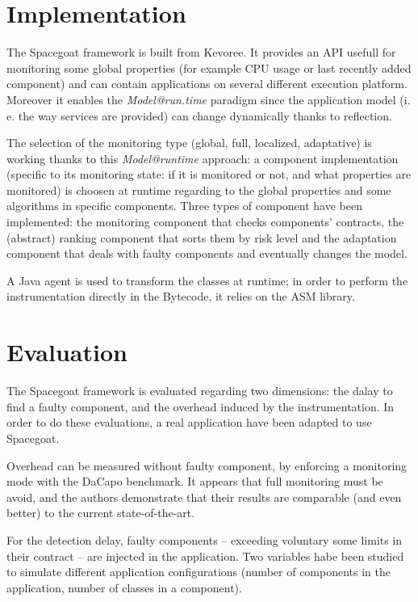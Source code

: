 \section{Implementation}

The \textsf{Spacegoat} framework is built from \textsf{Kevoree}. It provides an API usefull for monitoring some global properties (for example CPU usage or last recently added component) and can contain applications on several different execution platform. Moreover it enables the \emph{Model@run.time} paradigm since the application model (i. e. the way services are provided) can change dynamically thanks to reflection. 

The selection of the monitoring type (global, full, localized, adaptative) is working thanks to this \emph{Model@runtime} approach: a component implementation (specific to  its monitoring state: if it is monitored or not, and what properties are monitored) is choosen at runtime regarding to the global properties and some algorithms in specific components. Three types of component have been implemented: the monitoring component that checks components' contracts, the (abstract) ranking component that sorts them by risk level and the adaptation component that deals with faulty components and eventually changes the model.

A Java agent is used to transform the classes at runtime; in order to perform the instrumentation directly in the Bytecode, it relies on the ASM library.

\section{Evaluation}

The \textsf{Spacegoat} framework is evaluated regarding two dimensions: the dalay to find a faulty component, and the overhead induced by the instrumentation. In order to do these evaluations, a real application have been adapted to use \textsf{Spacegoat}. 

Overhead can be measured without faulty component, by enforcing a monitoring mode with the \textsf{DaCapo} benchmark. It appears that full monitoring must be avoid, and the authors demonstrate that their results are comparable (and even better) to the current state-of-the-art. 

For the detection delay, faulty components -- exceeding voluntary some limits in their contract -- are injected in the application. Two variables habe been studied to simulate different application configurations (number of components in the application, number of classes in a component). 

